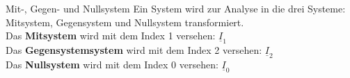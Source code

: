 \begin{frame}

    \begin{Merksatz}{Mit-, Gegen- und Nullsystem}
        Ein System wird zur Analyse in die drei Systeme: Mitsystem, Gegensystem und Nullsystem transformiert. \\
        Das {\bf Mitsystem} wird mit dem Index 1 versehen: \qquad  $\underline{I}_1$ \\
        Das {\bf Gegensystemsystem} wird mit dem Index 2 versehen: \qquad $\underline{I}_2$ \\
        Das {\bf Nullsystem} wird mit dem Index 0 versehen: \qquad $\underline{I}_0$ 
    \end{Merksatz}
\end{frame}



